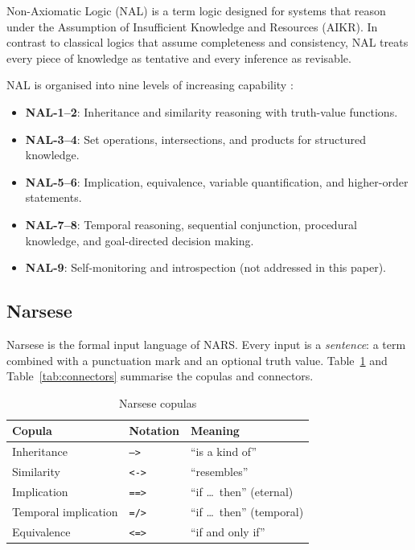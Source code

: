 \documentclass[11pt,a4paper]{article}
\begin{document}
Non-Axiomatic Logic (NAL) \citep{wang2006rigid} is a term logic designed for
systems that reason under the Assumption of Insufficient Knowledge and
Resources (AIKR). In contrast to classical logics that assume completeness and
consistency, NAL treats every piece of knowledge as tentative and every
inference as revisable.

NAL is organised into nine levels of increasing capability \citep{wang2013non}:

\begin{itemize}
\item \textbf{NAL-1--2}: Inheritance and similarity reasoning with
  truth-value functions.
\item \textbf{NAL-3--4}: Set operations, intersections, and products for
  structured knowledge.
\item \textbf{NAL-5--6}: Implication, equivalence, variable quantification,
  and higher-order statements.
\item \textbf{NAL-7--8}: Temporal reasoning, sequential conjunction,
  procedural knowledge, and goal-directed decision making.
\item \textbf{NAL-9}: Self-monitoring and introspection (not addressed in
  this paper).
\end{itemize}

\subsection{Narsese}

Narsese is the formal input language of NARS. Every input is a \emph{sentence}:
a term combined with a punctuation mark and an optional truth value.
Table~\ref{tab:copulas} and Table~\ref{tab:connectors} summarise the copulas
and connectors.

\begin{table}[h]
\centering
\caption{Narsese copulas}
\label{tab:copulas}
\begin{tabular}{lll}
\toprule
\textbf{Copula} & \textbf{Notation} & \textbf{Meaning} \\
\midrule
Inheritance & \texttt{-->} & ``is a kind of'' \\
Similarity & \texttt{<->} & ``resembles'' \\
Implication & \texttt{==>} & ``if \ldots\ then'' (eternal) \\
Temporal implication & \texttt{=/>} & ``if \ldots\ then'' (temporal) \\
Equivalence & \texttt{<=>} & ``if and only if'' \\
\bottomrule
\end{tabular}
\end{table}
\end{document}

